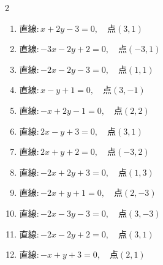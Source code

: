 \begin{multicols}{2}
\begin{enumerate}
  \item $直線:x+2y-3=0,\quad 点 ( 3, 1 )$


  \item $直線:-3x-2y+2=0,\quad 点 ( -3, 1 )$


  \item $直線:-2x-2y-3=0,\quad 点 ( 1, 1 )$


  \item $直線:x-y+1=0,\quad 点 ( 3, -1 )$


  \item $直線:-x+2y-1=0,\quad 点 ( 2, 2 )$


  \item $直線:2x-y+3=0,\quad 点 ( 3, 1 )$


  \item $直線:2x+y+2=0,\quad 点 ( -3, 2 )$


  \item $直線:-2x+2y+3=0,\quad 点 ( 1, 3 )$


  \item $直線:-2x+y+1=0,\quad 点 ( 2, -3 )$


  \item $直線:-2x-3y-3=0,\quad 点 ( 3, -3 )$

        \phantom{$\displaystyle 距離 : 0$}

\columnbreak %

\resetques

  \item $直線:-2x-2y+2=0,\quad 点 ( 3, 1 )$


  \item $直線:-x+y+3=0,\quad 点 ( 2, 1 )$


\end{enumerate}
\end{multicols}
